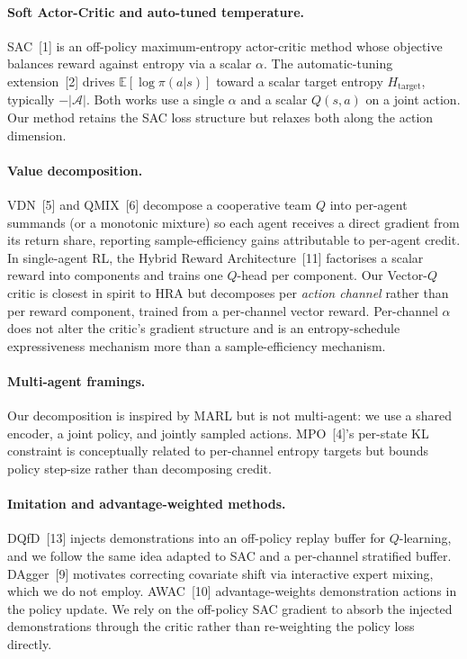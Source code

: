 \documentclass{article}
\begin{document}
\paragraph{Soft Actor-Critic and auto-tuned temperature.}
SAC~[1] is an off-policy maximum-entropy actor-critic method whose
objective balances reward against entropy via a scalar $\alpha$. The
automatic-tuning extension~[2] drives $\mathbb{E}[\log\pi(a|s)]$
toward a scalar target entropy $H_\text{target}$, typically
$-|\mathcal A|$. Both works use a single $\alpha$ and a scalar
$Q(s,a)$ on a joint action. Our method retains the SAC loss structure
but relaxes both along the action dimension.

\paragraph{Value decomposition.}
VDN~[5] and QMIX~[6] decompose a cooperative team $Q$ into per-agent
summands (or a monotonic mixture) so each agent receives a direct
gradient from its return share, reporting sample-efficiency gains
attributable to per-agent credit. In single-agent RL, the Hybrid
Reward Architecture~[11] factorises a scalar reward into components
and trains one $Q$-head per component. Our Vector-$Q$ critic is
closest in spirit to HRA but decomposes per \emph{action channel}
rather than per reward component, trained from a per-channel vector
reward. Per-channel $\alpha$ does not alter the critic's gradient
structure and is an entropy-schedule expressiveness mechanism
more than a sample-efficiency mechanism.

\paragraph{Multi-agent framings.}
Our decomposition is inspired by MARL but is not multi-agent: we use
a shared encoder, a joint policy, and jointly sampled actions.
MPO~[4]'s per-state KL constraint is conceptually related to
per-channel entropy targets but bounds policy step-size rather than
decomposing credit.

\paragraph{Imitation and advantage-weighted methods.}
DQfD~[13] injects demonstrations into an off-policy replay buffer for
$Q$-learning, and we follow the same idea adapted to SAC and a
per-channel stratified buffer. DAgger~[9] motivates correcting
covariate shift via interactive expert mixing, which we do not
employ. AWAC~[10] advantage-weights demonstration actions in the
policy update. We rely on the off-policy SAC gradient to absorb the
injected demonstrations through the critic rather than re-weighting
the policy loss directly.
\end{document}
